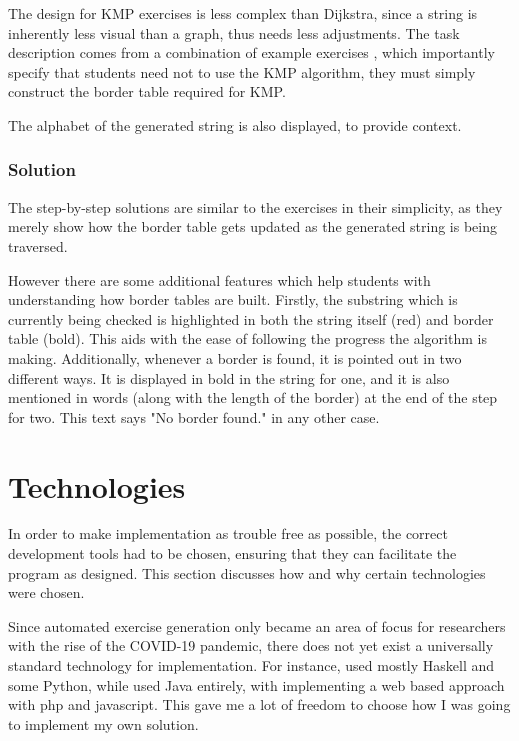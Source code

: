 \documentclass{l4proj}
\begin{document}
The design for KMP exercises is less complex than Dijkstra, since a string is inherently less visual than a graph, thus needs less adjustments. The task description comes from a combination of example exercises \cite{a}, which importantly specify that students need not to use the KMP algorithm, they must simply construct the border table required for KMP. 

The alphabet of the generated string is also displayed, to provide context.

\subsubsection{Solution}

The step-by-step solutions are similar to the exercises in their simplicity, as they merely show how the border table gets updated as the generated string is being traversed.

However there are some additional features which help students with understanding how border tables are built. Firstly, the substring which is currently being checked is highlighted in both the string itself (red) and border table (bold). This aids with the ease of following the progress the algorithm is making. Additionally, whenever a border is found, it is pointed out in two different ways. It is displayed in bold in the string for one, and it is also mentioned in words (along with the length of the border) at the end of the step for two. This text says "No border found." in any other case.

\section{Technologies}

In order to make implementation as trouble free as possible, the correct development tools had to be chosen, ensuring that they can facilitate the program as designed. This section discusses how and why certain technologies were chosen.

Since automated exercise generation only became an area of focus for researchers with the rise of the COVID-19 pandemic, there does not yet exist a universally standard technology for implementation. For instance, \citet{Hoz21} used mostly Haskell and some Python, while \citet {Esh22} used Java entirely, with \citet{Kot19} implementing a web based approach with php and javascript. This gave me a lot of freedom to choose how I was going to implement my own solution. 
\end{document}

